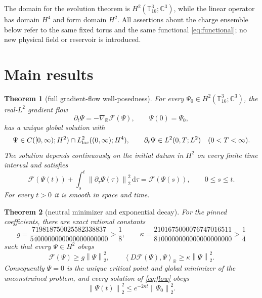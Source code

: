 \documentclass[11pt]{article}
\numberwithin{equation}{section}
\newtheorem{theorem}{Theorem}[section]
\theoremstyle{definition}
\newcommand{\T}{\mathbb T}
\newcommand{\C}{\mathbb C}
\newcommand{\R}{\mathbb R}
\newcommand{\cF}{\mathcal F}
\newcommand{\dd}{\,\mathrm d}
\newcommand{\norm}[1]{\left\lVert#1\right\rVert}
\newcommand{\ip}[2]{\left\langle #1,#2\right\rangle}
\newcommand{\grad}{\nabla_{\!\R}}
\begin{document}
The domain for the evolution theorem is $H^2(\T^3_{16};\C^3)$, while the
linear operator has domain $H^4$ and form domain $H^2$.  All assertions about
the charge ensemble below refer to the same fixed torus and the same
functional \eqref{eq:functional}; no new physical field or reservoir is
introduced.

\section{Main results}

\begin{theorem}[full gradient-flow well-posedness]
\label{thm:a2-flow}
For every
$\Psi_0\in H^2(\T^3_{16};\C^3)$, the real-$L^2$ gradient flow
\begin{equation}
 \partial_t\Psi=-\grad\cF(\Psi),\qquad \Psi(0)=\Psi_0,
 \label{eq:flow}
\end{equation}
has a unique global solution with
\begin{equation}
 \Psi\in C([0,\infty);H^2)\cap L^2_{\rm loc}((0,\infty);H^4),\qquad
 \partial_t\Psi\in L^2(0,T;L^2)\quad (0<T<\infty).
 \label{eq:solution-class}
\end{equation}
The solution depends continuously on the initial datum in $H^2$ on every
finite time interval and satisfies
\begin{equation}
 \cF(\Psi(t))+\int_s^t\norm{\partial_\tau\Psi(\tau)}_2^2\dd\tau
       =\cF(\Psi(s)),\qquad 0\le s\le t.
 \label{eq:energy-id}
\end{equation}
For every $t>0$ it is smooth in space and time.
\end{theorem}

\begin{theorem}[neutral minimizer and exponential decay]
\label{thm:r157-neutral}
For the pinned coefficients, there are exact rational constants
\begin{equation}
 g=\frac{719818750025582338837}{5400000000000000000000}>\frac18,\qquad
 \kappa=\frac{2101675000076747016511}{8100000000000000000000}>\frac14
 \label{eq:g-kappa}
\end{equation}
such that every $\Psi\in H^2$ obeys
\begin{equation}
 \cF(\Psi)\ge g\norm{\Psi}_2^2,\qquad
 \ip{D\cF(\Psi)}{\Psi}_{\R}\ge\kappa\norm{\Psi}_2^2.
 \label{eq:neutral-bounds}
\end{equation}
Consequently $\Psi=0$ is the unique critical point and global minimizer of
the unconstrained problem, and every solution of \eqref{eq:flow} obeys
\begin{equation}
 \norm{\Psi(t)}_2^2\le e^{-2\kappa t}\norm{\Psi_0}_2^2.
 \label{eq:decay}
\end{equation}
\end{theorem}
\end{document}
